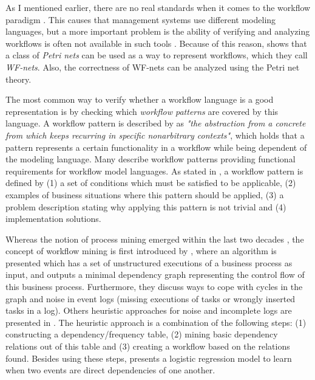 \documentclass[a4paper,11pt]{article}
\begin{document}
As I mentioned earlier, there are no real standards when it comes to the workflow paradigm \cite{VanderAalst1997}. This causes that management systems use different modeling languages, but a more important problem is the ability of verifying and analyzing workflows is often not available in such tools \cite{VanderAalst1997}. Because of this reason, \cite{VanderAalst1997} shows that a class of \textit{Petri nets} can be used as a way to represent workflows, which they call \textit{WF-nets}. Also, the correctness of WF-nets can be analyzed using the Petri net theory. 


The most common way to verify whether a workflow language is a good representation is by checking which \textit{workflow patterns} are covered by this language. A workflow pattern is described by \cite{Riehle1996} as \textit{"the abstraction from a concrete from which keeps recurring in specific nonarbitrary contexts"}, which holds that a pattern represents a certain functionality in a workflow while being dependent of the modeling language. Many \cite{VanderAalst2003Patterns,Dijkstra2003ControlPatterns,Russell2004DataPatterns,Russell2005ResourcePatterns,Russell2006ExceptionPatterns} describe workflow patterns providing functional requirements for workflow model languages. As stated in \cite{VanderAalst2003Patterns,Dijkstra2003ControlPatterns,Russell2004DataPatterns,Russell2005ResourcePatterns,Russell2006ExceptionPatterns}, a workflow pattern is defined by (1) a set of conditions which must be satisfied to be applicable, (2) examples of business situations where this pattern should be applied, (3) a problem description stating why applying this pattern is not trivial and (4) implementation solutions.

Whereas the notion of process mining emerged within the last two decades \cite{VanderAalst2003}, the concept of workflow mining is first introduced by \cite{Agrawal1998}, where an algorithm is presented which has a set of unstructured executions of a business process as input, and outputs a minimal dependency graph representing the control flow of this business process. Furthermore, they discuss ways to cope with cycles in the graph and noise in event logs (missing executions of tasks or wrongly inserted tasks in a log). Others heuristic approaches for noise and incomplete logs are presented in \cite{Maruster2002,Weijters2001,Weijters}. The heuristic approach \cite{Weijters2001,Weijters} is a combination of the following steps: (1) constructing a dependency/frequency table, (2) mining basic dependency relations out of this table and (3) creating a workflow based on the relations found. Besides using these steps, \cite{Maruster2002} presents a logistic regression model to learn when two events are direct dependencies of one another. 
\end{document}
